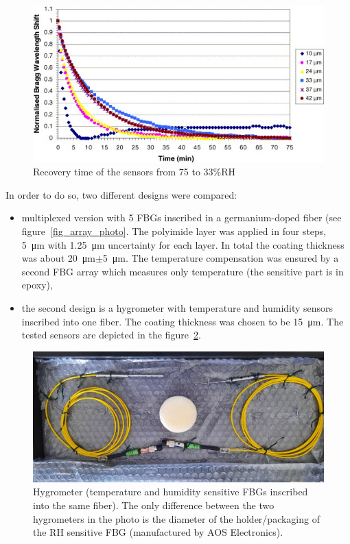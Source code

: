 \begin{figure}[!h]
\centering
\includegraphics[width=0.75\columnwidth]{Chapter5/images/time_response_yeo.jpg}
\caption{Recovery time of the sensors from 75 to 33\%RH~\cite{YEO_PI}}
\label{fig:yeo2}
\end{figure}

In order to do so, two different designs were compared:
\begin{itemize}
    \item multiplexed version with 5 \glspl{FBG} inscribed in a germanium-doped fiber (see figure~\ref{fig_array_photo}. The polyimide layer was applied in four steps, \SI{5}{\micro\metre} with \SI{1.25}{\micro\metre} uncertainty for each layer. In total the coating thickness was about \SI{20}{\micro\metre}$\pm$\SI{5}{\micro\metre}. The temperature compensation was ensured by a second \gls{FBG} array which measures only temperature (the sensitive part is in epoxy),
    \item the second design is a hygrometer with temperature and humidity sensors inscribed into one fiber. The coating thickness was chosen to be \SI{15}{\micro\metre}. The tested sensors are depicted in the figure~\ref{fig_single_photo}.
\end{itemize}

\begin{figure}[!h]
\centering
\includegraphics[width=0.75\columnwidth]{Chapter5/images/single1.jpeg}
\caption{Hygrometer (temperature and humidity sensitive \glspl{FBG} inscribed into the same fiber). The only difference between the two hygrometers in the photo is the diameter of the holder/packaging of the \gls{RH} sensitive \gls{FBG} (manufactured by AOS Electronics).}
\label{fig_single_photo}
\end{figure}

